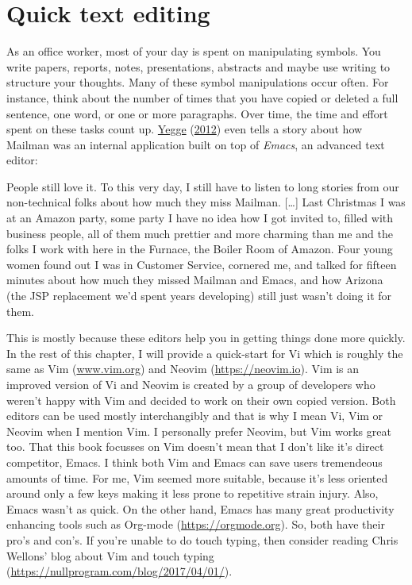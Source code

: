 \documentclass[
  14pt
  american,
  paper=a4,
  ,captions=tableheading
]{scrbook}
\renewenvironment{quote}{\begin{customblockquote}\list{}{\rightmargin=0em\leftmargin=0em}%
\item\relax\color{blockquote-text}\ignorespaces}{\unskip\unskip\endlist\end{customblockquote}}
\begin{document}
\hypertarget{sec:editing}{%
\chapter{Quick text editing}\label{sec:editing}}

As an office worker, most of your day is spent on manipulating symbols.
You write papers, reports, notes, presentations, abstracts and maybe use
writing to structure your thoughts. Many of these symbol manipulations
occur often. For instance, think about the number of times that you have
copied or deleted a full sentence, one word, or one or more paragraphs.
Over time, the time and effort spent on these tasks count up.
\protect\hyperlink{ref-yegge2012programmer}{Yegge}
(\protect\hyperlink{ref-yegge2012programmer}{2012}) even tells a story
about how Mailman was an internal application built on top of
\emph{Emacs}, an advanced text editor:

\begin{quote}
People still love it. To this very day, I still have to listen to long
stories from our non-technical folks about how much they miss Mailman.
{[}\ldots{]} Last Christmas I was at an Amazon party, some party I have
no idea how I got invited to, filled with business people, all of them
much prettier and more charming than me and the folks I work with here
in the Furnace, the Boiler Room of Amazon. Four young women found out I
was in Customer Service, cornered me, and talked for fifteen minutes
about how much they missed Mailman and Emacs, and how Arizona (the JSP
replacement we'd spent years developing) still just wasn't doing it for
them.
\end{quote}

This is mostly because these editors help you in getting things done
more quickly. In the rest of this chapter, I will provide a quick-start
for Vi which is roughly the same as Vim
(\href{https://www.vim.org}{www.vim.org}) and Neovim
(\url{https://neovim.io}). Vim is an improved version of Vi and Neovim
is created by a group of developers who weren't happy with Vim and
decided to work on their own copied version. Both editors can be used
mostly interchangibly and that is why I mean Vi, Vim or Neovim when I
mention Vim. I personally prefer Neovim, but Vim works great too. That
this book focusses on Vim doesn't mean that I don't like it's direct
competitor, Emacs. I think both Vim and Emacs can save users tremendeous
amounts of time. For me, Vim seemed more suitable, because it's less
oriented around only a few keys making it less prone to repetitive
strain injury. Also, Emacs wasn't as quick. On the other hand, Emacs has
many great productivity enhancing tools such as Org-mode
(\url{https://orgmode.org}). So, both have their pro's and con's. If
you're unable to do touch typing, then consider reading Chris Wellons'
blog about Vim and touch typing
(\url{https://nullprogram.com/blog/2017/04/01/}).
\end{document}
